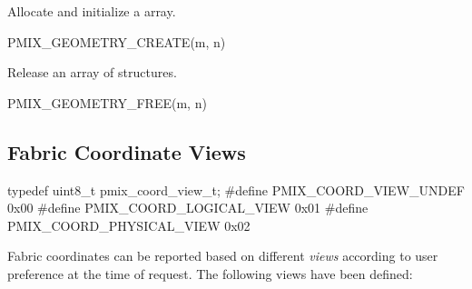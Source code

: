 \begin{arglist}
\end{arglist}


Allocate and initialize a  array.

\cspecificstart
\begin{codepar}
PMIX_GEOMETRY_CREATE(m, n)
\end{codepar}
\cspecificend

\begin{arglist}
\end{arglist}


Release an array of  structures.

\cspecificstart
\begin{codepar}
PMIX_GEOMETRY_FREE(m, n)
\end{codepar}
\cspecificend

\begin{arglist}
\end{arglist}


\subsection{Fabric Coordinate Views}

\cspecificstart
\begin{codepar}
typedef uint8_t pmix_coord_view_t;
#define PMIX_COORD_VIEW_UNDEF       0x00
#define PMIX_COORD_LOGICAL_VIEW     0x01
#define PMIX_COORD_PHYSICAL_VIEW    0x02
\end{codepar}
\cspecificend

Fabric coordinates can be reported based on different \emph{views} according to user preference at the time of request. The following views have been defined:

